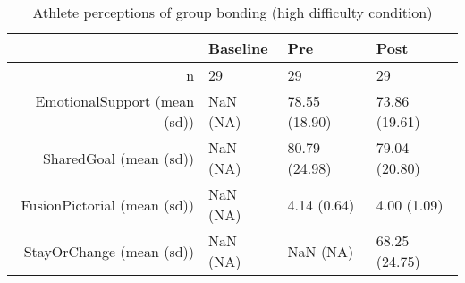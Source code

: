 \begin{table}[ht]
\centering
\begin{tabular}{rlll}
  \hline
 & Baseline & Pre & Post \\ 
  \hline
n &  29 &    29 &    29 \\ 
  EmotionalSupport (mean (sd)) & NaN (NA) & 78.55 (18.90) & 73.86 (19.61) \\ 
  SharedGoal (mean (sd)) & NaN (NA) & 80.79 (24.98) & 79.04 (20.80) \\ 
  FusionPictorial (mean (sd)) & NaN (NA) &  4.14 (0.64) &  4.00 (1.09) \\ 
  StayOrChange (mean (sd)) & NaN (NA) &   NaN (NA) & 68.25 (24.75) \\ 
   \hline
\end{tabular}
\caption{Athlete perceptions of 
 group bonding (high difficulty condition)} 
\end{table}

